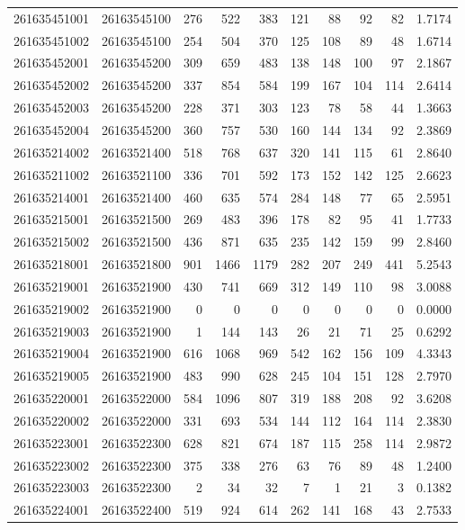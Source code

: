 \documentclass[
  11pt,
]{article}
\begin{document}
\begin{longtable}[t]{llrrrrrrrr}
261635451001 & 26163545100 & 276 & 522 & 383 & 121 & 88 & 92 & 82 & 1.7174\\
261635451002 & 26163545100 & 254 & 504 & 370 & 125 & 108 & 89 & 48 & 1.6714\\
261635452001 & 26163545200 & 309 & 659 & 483 & 138 & 148 & 100 & 97 & 2.1867\\
261635452002 & 26163545200 & 337 & 854 & 584 & 199 & 167 & 104 & 114 & 2.6414\\
261635452003 & 26163545200 & 228 & 371 & 303 & 123 & 78 & 58 & 44 & 1.3663\\
261635452004 & 26163545200 & 360 & 757 & 530 & 160 & 144 & 134 & 92 & 2.3869\\
261635214002 & 26163521400 & 518 & 768 & 637 & 320 & 141 & 115 & 61 & 2.8640\\
261635211002 & 26163521100 & 336 & 701 & 592 & 173 & 152 & 142 & 125 & 2.6623\\
261635214001 & 26163521400 & 460 & 635 & 574 & 284 & 148 & 77 & 65 & 2.5951\\
261635215001 & 26163521500 & 269 & 483 & 396 & 178 & 82 & 95 & 41 & 1.7733\\
261635215002 & 26163521500 & 436 & 871 & 635 & 235 & 142 & 159 & 99 & 2.8460\\
261635218001 & 26163521800 & 901 & 1466 & 1179 & 282 & 207 & 249 & 441 & 5.2543\\
261635219001 & 26163521900 & 430 & 741 & 669 & 312 & 149 & 110 & 98 & 3.0088\\
261635219002 & 26163521900 & 0 & 0 & 0 & 0 & 0 & 0 & 0 & 0.0000\\
261635219003 & 26163521900 & 1 & 144 & 143 & 26 & 21 & 71 & 25 & 0.6292\\
261635219004 & 26163521900 & 616 & 1068 & 969 & 542 & 162 & 156 & 109 & 4.3343\\
261635219005 & 26163521900 & 483 & 990 & 628 & 245 & 104 & 151 & 128 & 2.7970\\
261635220001 & 26163522000 & 584 & 1096 & 807 & 319 & 188 & 208 & 92 & 3.6208\\
261635220002 & 26163522000 & 331 & 693 & 534 & 144 & 112 & 164 & 114 & 2.3830\\
261635223001 & 26163522300 & 628 & 821 & 674 & 187 & 115 & 258 & 114 & 2.9872\\
261635223002 & 26163522300 & 375 & 338 & 276 & 63 & 76 & 89 & 48 & 1.2400\\
261635223003 & 26163522300 & 2 & 34 & 32 & 7 & 1 & 21 & 3 & 0.1382\\
261635224001 & 26163522400 & 519 & 924 & 614 & 262 & 141 & 168 & 43 & 2.7533\\

\end{longtable}
\end{document}

